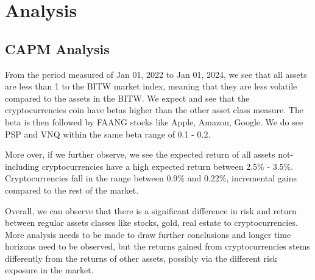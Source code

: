 \section{Analysis}
\subsection{CAPM Analysis}

From the period measured of Jan 01, 2022 to Jan 01, 2024, we see that all assets are less than 1 to the BITW market index, meaning that they are less volatile compared to the assets in the BITW. We expect and see that the cryptocurrencies coin have betas higher than the other asset class measure. The beta is then followed by FAANG stocks like Apple, Amazon, Google. We do see PSP and VNQ within the same beta range of 0.1 - 0.2. 

More over, if we further observe, we see the expected return of all assets not-including cryptocurrencies have a high expected return between 2.5\% - 3.5\%. Cryptocurrencies fall in the range between 0.9\% and 0.22\%, incremental gains compared to the rest of the market.

Overall, we can observe that there is a significant difference in risk and return between regular assets classes like stocks, gold, real estate to cryptocurrencies. More analysis needs to be made to draw further conclusions and longer time horizons need to be observed, but the returns gained from cryptocurrencies stems differently from the returns of other assets, possibly via the different risk exposure in the market.